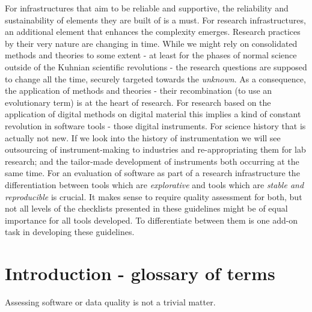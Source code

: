 \documentclass[a4paper,11pt]{article}
\begin{document}
For infrastructures that aim to be reliable and supportive, the
reliability and sustainability of elements they are built of is a must.
For research infrastructures, an additional element that enhances the
complexity emerges. Research practices by their very nature are changing in time. While
we might rely on consolidated methods and theories to some extent - at least
for the phases of normal science outside of the Kuhnian scientific revolutions
- the research questions are supposed to change all the time, securely targeted
towards the \textit{unknown}. As a consequence, the application of methods and
theories - their recombination (to use an evolutionary term) is at the heart of
research. For research based on the application of digital methods on digital
material this implies a kind of constant revolution in software tools - those
digital instruments.  For science history that is actually not new. If we look
into the history of instrumentation we will see outsourcing of %
instrument-making to industries and re-appropriating them for lab research; and
the tailor-made development of instruments both occurring at the same time.  For an
evaluation of software as part of a research infrastructure the
differentiation between tools which are \textit{explorative} and tools
which are \textit{stable and reproducible} is crucial. It makes sense to require
quality assessment for both, but not all levels of the
checklists presented in these guidelines might be of equal importance for all tools developed. To
differentiate between them is one add-on task in developing these guidelines. 

\section{Introduction - glossary of terms}

Assessing software or data quality is not a trivial matter. 
\end{document}

